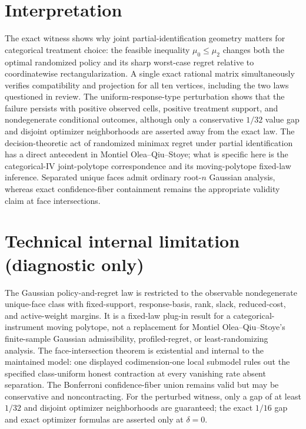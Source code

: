 \documentclass{article}
\begin{document}
\section{Interpretation}

The exact witness shows why joint partial-identification geometry matters for categorical treatment choice: the feasible inequality \(\mu_0\leq\mu_2\) changes both the optimal randomized policy and its sharp worst-case regret relative to coordinatewise rectangularization.  A single exact rational matrix simultaneously verifies compatibility and projection for all ten vertices, including the two laws questioned in review.  The uniform-response-type perturbation shows that the failure persists with positive observed cells, positive treatment support, and nondegenerate conditional outcomes, although only a conservative \(1/32\) value gap and disjoint optimizer neighborhoods are asserted away from the exact law.  The decision-theoretic act of randomized minimax regret under partial identification has a direct antecedent in Montiel Olea--Qiu--Stoye; what is specific here is the categorical-IV joint-polytope correspondence and its moving-polytope fixed-law inference.  Separated unique faces admit ordinary root-\(n\) Gaussian analysis, whereas exact confidence-fiber containment remains the appropriate validity claim at face intersections.

\section*{Technical internal limitation (diagnostic only)}

The Gaussian policy-and-regret law is restricted to the observable nondegenerate unique-face class with fixed-support, response-basis, rank, slack, reduced-cost, and active-weight margins.  It is a fixed-law plug-in result for a categorical-instrument moving polytope, not a replacement for Montiel Olea--Qiu--Stoye's finite-sample Gaussian admissibility, profiled-regret, or least-randomizing analysis.  The face-intersection theorem is existential and internal to the maintained model: one displayed codimension-one local submodel rules out the specified class-uniform honest contraction at every vanishing rate absent separation.  The Bonferroni confidence-fiber union remains valid but may be conservative and noncontracting.  For the perturbed witness, only a gap of at least \(1/32\) and disjoint optimizer neighborhoods are guaranteed; the exact \(1/16\) gap and exact optimizer formulas are asserted only at \(\delta=0\).
\end{document}
